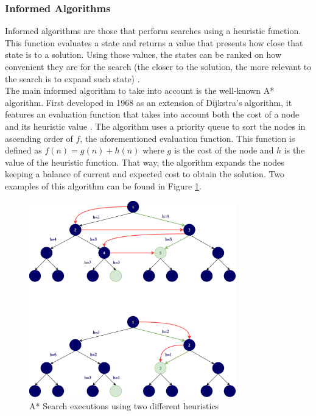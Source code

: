 \subsubsection{Informed Algorithms}

Informed algorithms are those that perform searches using a heuristic function.
This function evaluates a state and returns a value that presents how close
that state is to a solution. Using those values, the states can be ranked on
how convenient they are for the search (the closer to the solution, the more
relevant to the search is to expand such state) \cite{pearl-1984-heuristics}.\\

The main informed algorithm to take into account is the well-known A*
algorithm. First developed in 1968 as an extension of Dijkstra's algorithm, it
features an evaluation function that takes into account both the cost of a node
and its heuristic value \cite{hart-1968-formal}. The algorithm uses a priority
queue to sort the nodes in ascending order of $f$, the aforementioned
evaluation function. This function is defined as $f(n) = g(n) + h(n)$ where $g$
is the cost of the node and $h$ is the value of the heuristic function. That
way, the algorithm expands the nodes keeping a balance of current and expected
cost to obtain the solution. Two examples of this algorithm can be found in
Figure \ref{tree:astar}.\\

\begin{figure}[ht]
\centering
\includegraphics[width=0.8\textwidth]{img/astar.png}
\caption{A* Search executions using two different heuristics}
\label{tree:astar}
\end{figure}


